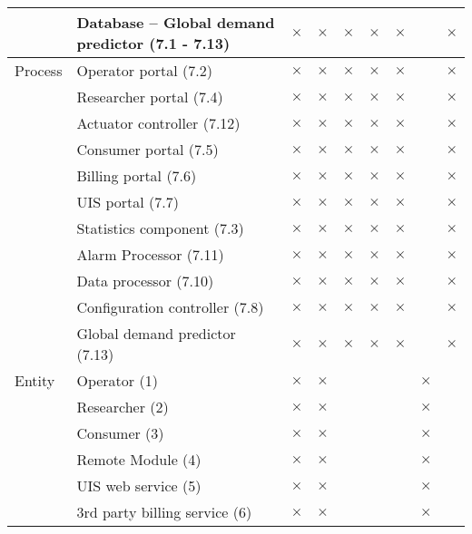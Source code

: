 \begin{table}[h!]
\begin{center}
\begin{longtable}{p{2.3cm} p{9cm} p{0.2cm} p{0.2cm} p{0.2cm} p{0.2cm}p{0.2cm} p{0.2cm} p{0.2cm} }
			&  Database -- Global demand predictor (7.1 - 7.13) & $\times$ & $\times$ & $\times$& $\times$ &  $\times$ & & $\times$\\		   
\midrule[0.5pt]
Process & Operator portal (7.2) & $\times$ & $\times$ & $\times$& $\times$ &  $\times$ & & $\times$\\
        & Researcher portal (7.4) & $\times$ & $\times$ & $\times$& $\times$ &  $\times$ & & $\times$\\
        & Actuator controller (7.12) & $\times$ & $\times$ & $\times$& $\times$ &  $\times$ & & $\times$\\
        & Consumer portal (7.5) & $\times$ & $\times$ & $\times$& $\times$ &  $\times$ & & $\times$\\
        & Billing portal (7.6) & $\times$ & $\times$ & $\times$& $\times$ &  $\times$ & & $\times$\\
        & UIS portal (7.7) & $\times$ & $\times$ & $\times$& $\times$ &  $\times$ & & $\times$\\
        & Statistics component (7.3) & $\times$ & $\times$ & $\times$& $\times$ &  $\times$ & & $\times$\\
        & Alarm Processor (7.11) & $\times$ & $\times$ & $\times$& $\times$ &  $\times$ & & $\times$\\
        & Data processor (7.10) & $\times$ & $\times$ & $\times$& $\times$ &  $\times$ & & $\times$\\
        & Configuration controller (7.8) & $\times$ & $\times$ & $\times$& $\times$ &  $\times$ & & $\times$\\
        & Global demand predictor (7.13) & $\times$ & $\times$ & $\times$& $\times$ &  $\times$ & & $\times$\\
\midrule[0.5pt]
Entity 	& Operator (1) & $\times$ & $\times$ & & &  & $\times$ & \\
	& Researcher (2) & $\times$ & $\times$ & & &  & $\times$ & \\
	& Consumer (3) & $\times$ & $\times$ & & &  & $\times$ & \\
	& Remote Module (4) & $\times$ & $\times$ & & &  & $\times$ & \\
	& UIS web service (5) & $\times$ & $\times$ & & &  & $\times$ & \\
	& 3rd party billing service (6) & $\times$ & $\times$ & & &  & $\times$ & \\
\bottomrule[1pt]

\end{longtable}
\end{center}

\end{table}


